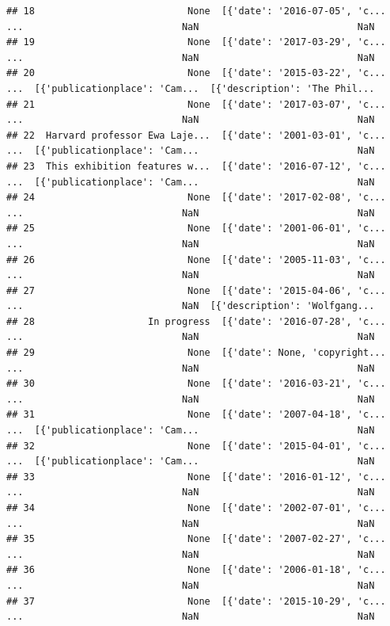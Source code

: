 \documentclass[
]{book}
\begin{document}
\begin{verbatim}
## 18                           None  [{'date': '2016-07-05', 'c...  ...                            NaN                            NaN
## 19                           None  [{'date': '2017-03-29', 'c...  ...                            NaN                            NaN
## 20                           None  [{'date': '2015-03-22', 'c...  ...  [{'publicationplace': 'Cam...  [{'description': 'The Phil...
## 21                           None  [{'date': '2017-03-07', 'c...  ...                            NaN                            NaN
## 22  Harvard professor Ewa Laje...  [{'date': '2001-03-01', 'c...  ...  [{'publicationplace': 'Cam...                            NaN
## 23  This exhibition features w...  [{'date': '2016-07-12', 'c...  ...  [{'publicationplace': 'Cam...                            NaN
## 24                           None  [{'date': '2017-02-08', 'c...  ...                            NaN                            NaN
## 25                           None  [{'date': '2001-06-01', 'c...  ...                            NaN                            NaN
## 26                           None  [{'date': '2005-11-03', 'c...  ...                            NaN                            NaN
## 27                           None  [{'date': '2015-04-06', 'c...  ...                            NaN  [{'description': 'Wolfgang...
## 28                    In progress  [{'date': '2016-07-28', 'c...  ...                            NaN                            NaN
## 29                           None  [{'date': None, 'copyright...  ...                            NaN                            NaN
## 30                           None  [{'date': '2016-03-21', 'c...  ...                            NaN                            NaN
## 31                           None  [{'date': '2007-04-18', 'c...  ...  [{'publicationplace': 'Cam...                            NaN
## 32                           None  [{'date': '2015-04-01', 'c...  ...  [{'publicationplace': 'Cam...                            NaN
## 33                           None  [{'date': '2016-01-12', 'c...  ...                            NaN                            NaN
## 34                           None  [{'date': '2002-07-01', 'c...  ...                            NaN                            NaN
## 35                           None  [{'date': '2007-02-27', 'c...  ...                            NaN                            NaN
## 36                           None  [{'date': '2006-01-18', 'c...  ...                            NaN                            NaN
## 37                           None  [{'date': '2015-10-29', 'c...  ...                            NaN                            NaN

\end{verbatim}
\end{document}

